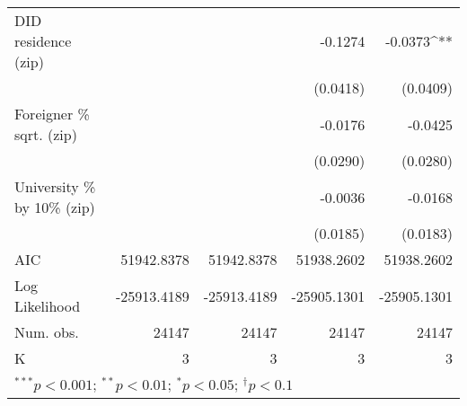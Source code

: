 \begin{tabular}{l D{.}{.}{6.7} D{.}{.}{6.11} D{.}{.}{6.7} D{.}{.}{6.11}}
DID residence (zip)               &               &                   & -0.1274       & -0.0373^{**}     \\
                                  &               &                   & (0.0418)      & (0.0409)         \\
Foreigner \% sqrt. (zip)          &               &                   & -0.0176       & -0.0425          \\
                                  &               &                   & (0.0290)      & (0.0280)         \\
University \% by 10\% (zip)       &               &                   & -0.0036       & -0.0168          \\
                                  &               &                   & (0.0185)      & (0.0183)         \\
\midrule
AIC                               & 51942.8378    & 51942.8378        & 51938.2602    & 51938.2602       \\
Log Likelihood                    & -25913.4189   & -25913.4189       & -25905.1301   & -25905.1301      \\
Num. obs.                         & 24147         & 24147             & 24147         & 24147            \\
K                                 & 3             & 3                 & 3             & 3                \\
\bottomrule
{}
\end{tabular}

